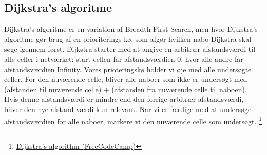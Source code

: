 \documentclass[12pt]{article}
\begin{document}
\subsection{Dijkstra’s algoritme}
Dijkstra’s algoritme er en variation af Breadth-First Search, men hvor Dijkstra’s algoritme gør brug af en prioriterings kø, som afgør hvilken nabo Dijkstra skal søge igennem først. 
Dijkstra starter med at angive en arbitrær afstandsværdi til alle celler i netværket: start cellen får afstandsværdien 0, hvor alle andre får afstandsværdien Infinity. 
Vores prioteringskø holder vi øje med alle undersøgte celler. For den nuværende celle, bliver alle naboer som ikke er undersøgt med (afstanden til nuværende celle) + 
(afstanden fra nuværende celle til naboen). Hvis denne afstandsværdi er mindre end den forrige arbitrær afstandsværdi, bliver den nye afstand værdi kun relevant. 
Når vi er færdige med at undersøge afstandsværdien for alle naboer, markere vi den nuværende celle som undersøgt.
\footnote{\href{https://www.freecodecamp.org/news/dijkstras-shortest-path-algorithm-visual-introduction/}{Dijkstra’s algorithm (FreeCodeCamp)}}  
\end{document}
